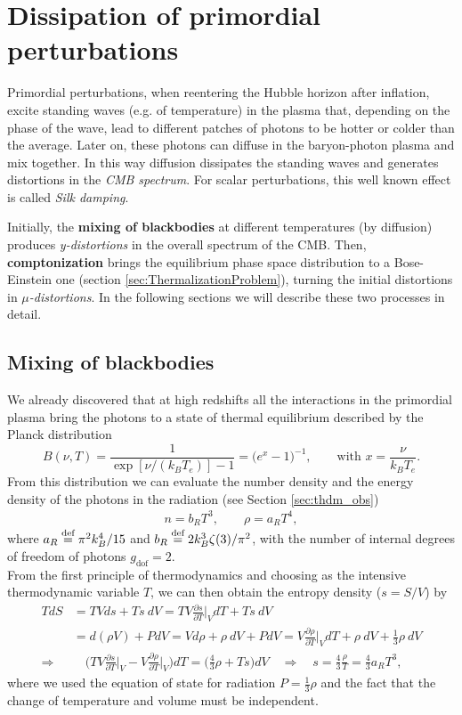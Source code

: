 \section{Dissipation of primordial perturbations}
\label{sec:dissipation_PGW}
Primordial perturbations, when reentering the Hubble horizon after inflation, excite standing waves (e.g. of temperature) in the plasma that, depending on the phase of the wave, lead to different patches of photons to be hotter or colder than the average. Later on, these photons can diffuse in the baryon-photon plasma and mix together. In this way diffusion dissipates the standing waves and generates distortions in the \emph{CMB spectrum}. For scalar perturbations, this well known effect is called \emph{Silk damping}.

Initially, the \textbf{mixing of blackbodies} at different temperatures (by diffusion) produces \emph{y-distortions} in the overall spectrum of the CMB. Then, \textbf{comptonization} brings the equilibrium phase space distribution to a Bose-Einstein one (section \ref{sec:ThermalizationProblem}), turning the initial distortions in \emph{$\mu$-distortions}. In the following sections we will describe these two processes in detail.
\subsection{Mixing of blackbodies}\label{sec:MixingOfBlackbodies}
We already discovered that at high redshifts all the interactions in the primordial plasma bring the photons to a state of thermal equilibrium described by the Planck distribution
$$B(\nu,T)=\frac{1}{\exp[\nu/(k_BT_e)]-1}=\big(e^x-1\big)^{-1},\qquad \text{with }x=\frac{\nu}{k_BT_e}.$$
From this distribution we can evaluate the number density and the energy density of the photons in the radiation (see Section \ref{sec:thdm_obs})
\begin{align*}
    n=b_RT^3,\qquad \rho=a_RT^4,
\end{align*}
where $a_R\stackrel{\text{def}}{=}\pi^2k_B^4/15$ and $b_R\stackrel{\text{def}}{=} 2k_B^3\zeta(3)/\pi^2$, with the number of internal degrees of freedom of photons $g_\text{dof}=2$.\\From the first principle of thermodynamics and choosing as the intensive thermodynamic variable $T$, we can then obtain the entropy density ($s=S/V$) by
\begin{align*}
    TdS&=TVds+Ts\ dV=TV\frac{\partial s}{\partial T}\bigg|_V dT+Ts\ dV\\&=d(\rho V)+PdV=Vd\rho+\rho\ dV+PdV=V\frac{\partial \rho}{\partial T}\bigg|_V dT+\rho\ dV+\frac{1}{3}\rho\ dV\\\Rightarrow& \quad \bigg(TV\frac{\partial s}{\partial T}\bigg|_V-V\frac{\partial \rho}{\partial T}\bigg|_V\bigg)dT=\bigg(\frac{4}{3}\rho+Ts\bigg)dV\quad\Rightarrow\quad \boxed{s=\frac{4}{3}\frac{\rho}{T}=\frac{4}{3}a_RT^3},
\end{align*}
where we used the equation of state for radiation $P=\frac{1}{3}\rho$ and the fact that the change of temperature and volume must be independent.

